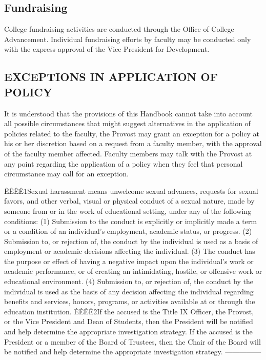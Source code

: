 \documentclass[letterpaper, 11pt]{article}
\begin{document}
	\subsection{Fundraising}
		College fundraising activities are conducted through the Office of College Advancement.  Individual fundraising efforts by faculty may be conducted only with the express approval of the Vice President for Development.

	\subsection{EXCEPTIONS IN APPLICATION OF POLICY}
		It is understood that the provisions of this Handbook cannot take into account all possible circumstances that might suggest alternatives in the application of policies related to the faculty, the Provost may grant an exception for a policy at his or her discretion based on a request from a faculty member, with the approval of the faculty member affected.  Faculty members may talk with the Provost at any point regarding the application of a policy when they feel that personal circumstance may call for an exception.





		ÊÊÊÊ1Sexual harassment means unwelcome sexual advances, requests for sexual favors, and other verbal, visual or physical conduct of a sexual nature, made by someone from or in the work of educational setting, under any of the following conditions:
		(1)  Submission to the conduct is explicitly or implicitly made a term or a condition of an individual's employment, academic status, or progress.
		(2)  Submission to, or rejection of, the conduct by the individual is used as a basis of employment or academic decisions affecting the individual.
		(3)  The conduct has the purpose or effect of having a negative impact upon the individual's work or academic performance, or of creating an intimidating, hostile, or offensive work or educational environment.
		(4)  Submission to, or rejection of, the conduct by the individual is used as the basis of any decision affecting the individual regarding benefits and services, honors, programs, or activities available at or through the education institution.
		ÊÊÊÊ2If the accused is the Title IX Officer, the Provost, or the Vice President and Dean of Students, then the President will be notified and help determine the appropriate investigation strategy.  If the accused is the President or a member of the Board of Trustees, then the Chair of the Board will be notified and help determine the appropriate investigation strategy.
		---------------
\end{document}
